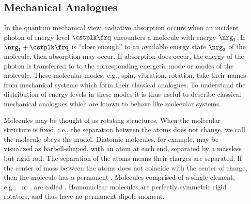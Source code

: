 \documentclass[12pt]{article}
\begin{document}
\subsection[Mechanical Analogues]{Mechanical Analogues}\label{sxn:mch_anl}
In the quantum mechanical view, radiative absorption occurs when an
incident photon of energy level $\cstplk \frq$ encounters a molecule
with energy $\nrg_{1}$. 
If $\nrg_{1} + \cstplk \frq$ is ``close enough'' to an available energy
state $\nrg_{2}$ of the molecule, then absorption may occur.
If absorption does occur, the energy of the photon is transferred to
to the corresponding energetic mode or modes of the molecule.
These molecular modes, e.g., spin, vibration, rotation, take their
names from mechanical systems which form their classical analogues.
To understand the distribution of energy levels in these modes
it is thus useful to describe classical mechanical analogues 
which are known to behave like molecular systems.

Molecules may be thought of as rotating structures.
When the molecular structure is fixed, i.e., the separation between
the atoms does not change, we call the molecule obeys the
 model.
Diatomic molecules, for example, may be visualized as barbell-shaped,
with an atom at each end, separated by a massless but rigid rod.
The separation of the atoms means their charges are separated.
If the center of mass between the atoms does not coincide with the 
center of charge, then the molecule has a permanent . 
Molecules comprised of a single element, e.g., \Nd\ or \Od, are called
.
Homonuclear molecules are perfectly symmetric rigid rotators, and thus
have no permanent dipole moment.
\end{document}
